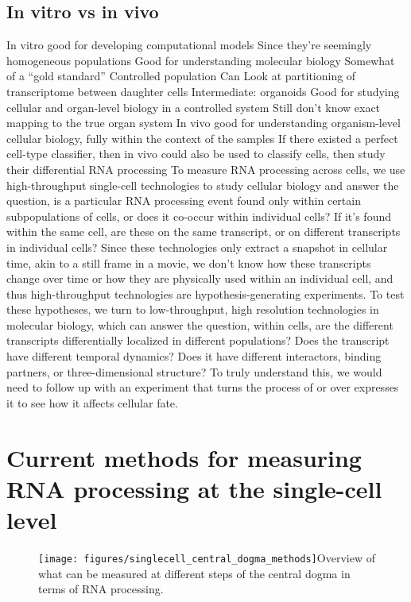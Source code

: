 \subsection{In vitro vs in vivo}
In vitro 
good for developing computational models 
Since they're seemingly homogeneous populations
Good for understanding molecular biology
Somewhat of a ``gold standard''
Controlled population
Can Look at partitioning of transcriptome between daughter cells
Intermediate: organoids
Good for studying cellular and organ-level biology in a controlled system
Still don't know exact mapping to the true organ system
In vivo  
good for understanding organism-level cellular biology, fully within the context of the samples
If there existed a perfect cell-type classifier, then in vivo could also be used to classify cells, then study their differential RNA processing
To measure RNA processing across cells, we use high-throughput single-cell technologies to study cellular biology and answer the question, is a particular RNA processing event found only within certain subpopulations of cells, or does it co-occur within individual cells? If it's found within the same cell, are these on the same transcript, or on different transcripts in individual cells? Since these technologies only extract a snapshot in cellular time, akin to a still frame in a movie, we don't know how these transcripts change over time or how they are physically used within an individual cell, and thus high-throughput technologies are hypothesis-generating experiments. 
To test these hypotheses, we turn to low-throughput, high resolution technologies in molecular biology, which can answer the question, within cells, are the different transcripts differentially localized in different populations? Does the transcript have different temporal dynamics? Does it have different interactors, binding partners, or three-dimensional structure? To truly understand this, we would need to follow up with an experiment that turns the process of or over expresses it to see how it affects cellular fate.


\section{Current methods for measuring RNA processing at the single-cell level}

\begin{figure}
  \centering
  \texttt{[image: figures/singlecell\_central\_dogma\_methods]}{Overview of what can be measured at different steps of the central dogma in terms of RNA processing.}
\label{fig:singlecell_central_dogma_methods}
\end{figure}

